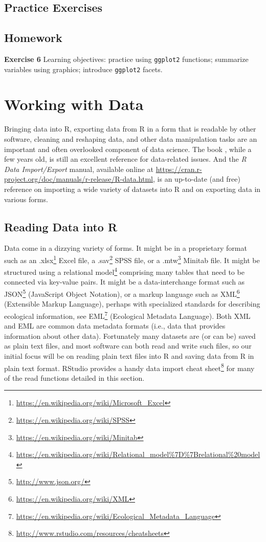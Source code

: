 \documentclass[]{krantz}
\renewcommand{\href}[2]{#2\footnote{\url{#1}}}
\begin{document}
\hypertarget{practice-exercises}{%
\section{Practice Exercises}\label{practice-exercises}}

\hypertarget{homework-2}{%
\section{Homework}\label{homework-2}}

\textbf{Exercise 6} Learning objectives: practice using \texttt{ggplot2} functions; summarize variables using graphics; introduce \texttt{ggplot2} facets.

\hypertarget{data2}{%
\chapter{Working with Data}\label{data2}}

Bringing data into R, exporting data from R in a form that is readable by other software, cleaning and reshaping data, and other data manipulation tasks are an important and often overlooked component of data science. The book \citet{SpectorDataManipulation}, while a few years old, is still an excellent reference for data-related issues. And the \emph{R Data Import/Export} manual, available online at \url{https://cran.r-project.org/doc/manuals/r-release/R-data.html}, is an up-to-date (and free) reference on importing a wide variety of datasets into R and on exporting data in various forms.

\hypertarget{reading-data-into-r}{%
\section{Reading Data into R}\label{reading-data-into-r}}

Data come in a dizzying variety of forms. It might be in a proprietary format such as an \href{https://en.wikipedia.org/wiki/Microsoft_Excel}{.xlsx} Excel file, a \href{https://en.wikipedia.org/wiki/SPSS}{.sav} SPSS file, or a \href{https://en.wikipedia.org/wiki/Minitab}{.mtw} Minitab file. It might be structured using a \href{https://en.wikipedia.org/wiki/Relational_model\%7D\%7Brelational\%20model}{relational model} comprising many tables that need to be connected via key-value pairs. It might be a data-interchange format such as \href{http://www.json.org/}{JSON} (JavaScript Object Notation), or a markup language such as \href{https://en.wikipedia.org/wiki/XML}{XML} (Extensible Markup Language), perhaps with specialized standards for describing ecological information, see \href{https://en.wikipedia.org/wiki/Ecological_Metadata_Language}{EML} (Ecological Metadata Language). Both XML and EML are common data metadata formats (i.e., data that provides information about other data). Fortunately many datasets are (or can be) saved as plain text files, and most software can both read and write such files, so our initial focus will be on reading plain text files into R and saving data from R in plain text format. RStudio provides a handy \href{http://www.rstudio.com/resources/cheatsheets}{data import cheat sheet} for many of the read functions detailed in this section.
\end{document}
